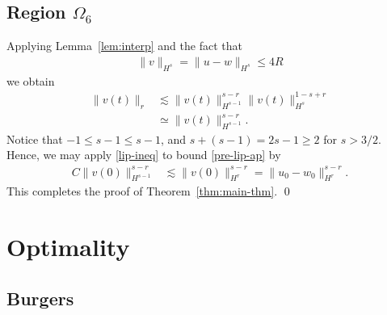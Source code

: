 \documentclass[12pt,reqno]{amsart}
\numberwithin{equation}{section}  %
\numberwithin{figure}{section}
\begin{document}
\subsection{Region $\Omega_{6}$} 
\label{ssec:case-2}
%
%
Applying Lemma~\ref{lem:interp} and the fact that 
%
%
\begin{equation*}
\begin{split}
  \|v\|_{H^{s}} = \|u - w \|_{H^{s}} \le 4R
\end{split}
\end{equation*}
%
%
we obtain
%
%
\begin{equation}
  \label{pre-lip-ap}
\begin{split}
  \| v(t) \|_{r} & \lesssim \| v(t) \|_{H^{s-1}}^{s-r} \|v(t) \|_{H^{s}}^{1-s+r}
  \\
  & \simeq \| v(t) \|_{H^{s-1}}^{s-r}.
\end{split}
\end{equation}
%
%
Notice that $-1 \le s-1 \le s-1$, and $s + (s-1) = 2s-1 \ge 2$ for $s >3/2$.
Hence, we may apply \eqref{lip-ineq} to bound \eqref{pre-lip-ap} by
%
%
\begin{equation*}
\begin{split}
  C \|v(0) \|_{H^{s-1}}^{s-r}
  & \lesssim \|v(0) \|_{H^{r}}^{s-r} 
  = \|u_{0} - w_{0}\|_{H^{r}}^{s-r}.
\end{split}
\end{equation*}
%
%
This completes the proof of Theorem~\ref{thm:main-thm}. \qed
%
%
%
%
%
%
%
%
\section{Optimality} 
\label{sec:optimality}
\subsection{Burgers} 
\label{ssec:burgers-opt}
\end{document}
